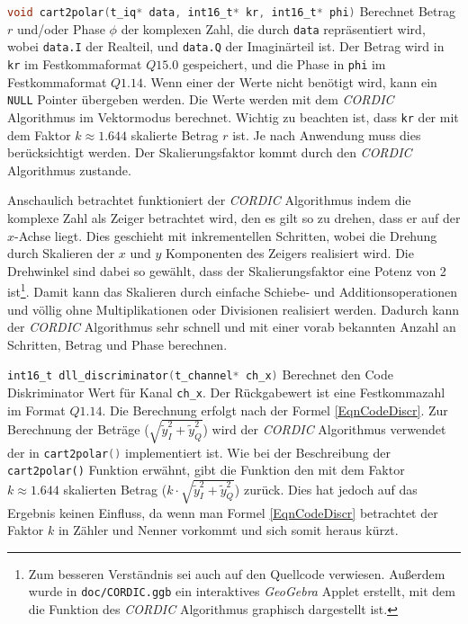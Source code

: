 \lstinline[language=C]$void cart2polar(t_iq* data, int16_t* kr, int16_t* phi)$
Berechnet Betrag $r$ und/oder Phase $\phi$ der komplexen Zahl, die durch \lstinline$data$ repräsentiert wird, wobei \lstinline$data.I$ der Realteil, und \lstinline$data.Q$ der Imaginärteil ist. Der Betrag wird in \lstinline$kr$ im Festkommaformat $Q15.0$ gespeichert, und die Phase in \lstinline$phi$ im Festkommaformat $Q1.14$. Wenn einer der Werte nicht benötigt wird, kann ein \lstinline$NULL$ Pointer übergeben werden. Die Werte werden mit dem \emph{CORDIC} Algorithmus im Vektormodus berechnet. Wichtig zu beachten ist, dass \lstinline$kr$ der mit dem Faktor $k \approx 1.644$ skalierte Betrag $r$ ist. Je nach Anwendung muss dies berücksichtigt werden. Der Skalierungsfaktor kommt durch den \emph{CORDIC} Algorithmus zustande.

Anschaulich betrachtet funktioniert der \emph{CORDIC} Algorithmus indem die komplexe Zahl als Zeiger betrachtet wird, den es gilt so zu drehen, dass er auf der $x$-Achse liegt. Dies geschieht mit inkrementellen Schritten, wobei die Drehung durch Skalieren der $x$ und $y$ Komponenten des Zeigers realisiert wird. Die Drehwinkel sind dabei so gewählt, dass der Skalierungsfaktor eine Potenz von 2 ist\footnote{Zum besseren Verständnis sei auch auf den Quellcode verwiesen. Außerdem wurde in \lstinline$doc/CORDIC.ggb$ ein interaktives \emph{GeoGebra} Applet erstellt, mit dem die Funktion des \emph{CORDIC} Algorithmus graphisch dargestellt ist.}. Damit kann das Skalieren durch einfache Schiebe- und Additionsoperationen und völlig ohne Multiplikationen oder Divisionen realisiert werden. Dadurch kann der \emph{CORDIC} Algorithmus sehr schnell und mit einer vorab bekannten Anzahl an Schritten, Betrag und Phase berechnen.

\lstinline[language=C]$int16_t dll_discriminator(t_channel* ch_x)$ 
Berechnet den Code Diskriminator Wert für Kanal \lstinline[language=C]$ch_x$. Der Rückgabewert ist eine Festkommazahl im Format $Q1.14$. Die Berechnung erfolgt nach der Formel \ref{EqnCodeDiscr}. Zur Berechnung der Beträge ($\sqrt{\tilde{y}_{I}^2+\tilde{y}_{Q}^2}$) wird der \emph{CORDIC} Algorithmus verwendet der in \lstinline[language=C]$cart2polar()$ implementiert ist. Wie bei der Beschreibung der \lstinline$cart2polar()$ Funktion erwähnt, gibt die Funktion den mit dem Faktor $k \approx 1.644$ skalierten Betrag ($k\cdot \sqrt{\tilde{y}_{I}^2+\tilde{y}_{Q}^2}$) zurück. Dies hat jedoch auf das Ergebnis keinen Einfluss, da wenn man Formel \ref{EqnCodeDiscr} betrachtet der Faktor $k$ in Zähler und Nenner vorkommt und sich somit heraus kürzt.


